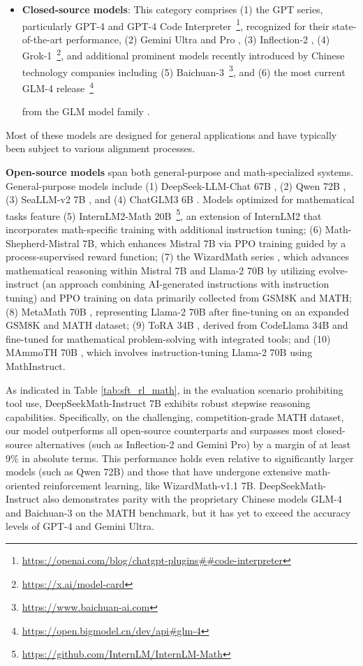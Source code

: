 \begin{itemize}[topsep=0pt]
    \item \textbf{Closed-source models}: This category comprises (1) the GPT series, particularly GPT-4 \citep{gpt4} and GPT-4 Code Interpreter~\footnote{\url{https://openai.com/blog/chatgpt-plugins\#\#code-interpreter}}, recognized for their state-of-the-art performance, (2) Gemini Ultra and Pro \citep{gemini}, (3) Inflection-2 \citep{inflection-2}, (4) Grok-1~\footnote{\url{https://x.ai/model-card}}, and additional prominent models recently introduced by Chinese technology companies including (5) Baichuan-3~\footnote{\url{https://www.baichuan-ai.com}}, and (6) the most current GLM-4 release~\footnote{\url{https://open.bigmodel.cn/dev/api\#glm-4}}
    
    from the GLM model family \citep{glm}.
\end{itemize}

Most of these models are designed for general applications and have typically been subject to various alignment processes.

\item \textbf{Open-source models} span both general-purpose and math-specialized systems. General-purpose models include (1) DeepSeek-LLM-Chat 67B \citep{deepseek-llm}, (2) Qwen 72B \citep{qwen}, (3) SeaLLM-v2 7B \citep{seallm}, and (4) ChatGLM3 6B \citep{chatglm3}. Models optimized for mathematical tasks feature (5) InternLM2-Math 20B~\footnote{\url{https://github.com/InternLM/InternLM-Math}}, an extension of InternLM2 that incorporates math-specific training with additional instruction tuning; (6) Math-Shepherd-Mistral 7B, which enhances Mistral 7B \citep{mistral} via PPO training \citep{schulman2017proximal} guided by a process-supervised reward function; (7) the WizardMath series \citep{wizardmath}, which advances mathematical reasoning within Mistral 7B and Llama-2 70B \citep{llama2} by utilizing evolve-instruct (an approach combining AI-generated instructions with instruction tuning) and PPO training on data primarily collected from GSM8K and MATH; (8) MetaMath 70B \citep{metamath}, representing Llama-2 70B after fine-tuning on an expanded GSM8K and MATH dataset; (9) ToRA 34B \cite{tora}, derived from CodeLlama 34B and fine-tuned for mathematical problem-solving with integrated tools; and (10) MAmmoTH 70B \citep{MathInstruct}, which involves instruction-tuning Llama-2 70B using MathInstruct.

As indicated in Table \ref{tab:sft_rl_math}, in the evaluation scenario prohibiting tool use, DeepSeekMath-Instruct 7B exhibits robust stepwise reasoning capabilities. Specifically, on the challenging, competition-grade MATH dataset, our model outperforms all open-source counterparts and surpasses most closed-source alternatives (such as Inflection-2 and Gemini Pro) by a margin of at least 9\% in absolute terms. This performance holds even relative to significantly larger models (such as Qwen 72B) and those that have undergone extensive math-oriented reinforcement learning, like WizardMath-v1.1 7B. DeepSeekMath-Instruct also demonstrates parity with the proprietary Chinese models GLM-4 and Baichuan-3 on the MATH benchmark, but it has yet to exceed the accuracy levels of GPT-4 and Gemini Ultra.

